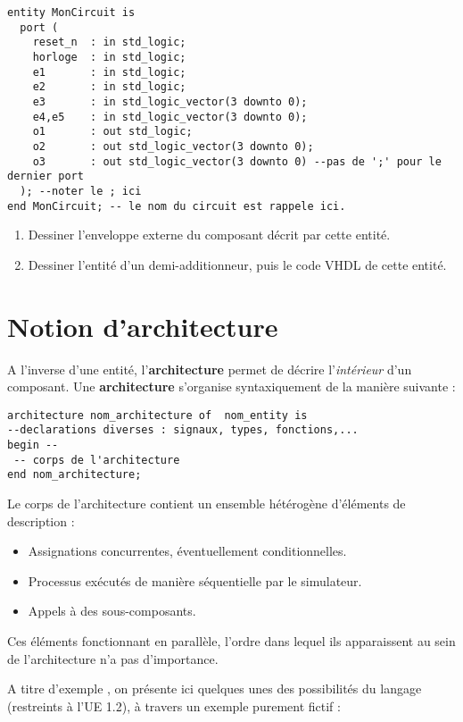 \documentclass[a4paper,11pt]{article}
\begin{document}
\begin{lstlisting}
entity MonCircuit is
  port (
    reset_n  : in std_logic;
    horloge  : in std_logic;
    e1       : in std_logic;
    e2       : in std_logic;
    e3       : in std_logic_vector(3 downto 0);
    e4,e5    : in std_logic_vector(3 downto 0);
    o1       : out std_logic;
    o2       : out std_logic_vector(3 downto 0);
    o3       : out std_logic_vector(3 downto 0) --pas de ';' pour le dernier port
  ); --noter le ; ici
end MonCircuit; -- le nom du circuit est rappele ici.
\end{lstlisting}

\begin{enumerate}
  \item Dessiner l'enveloppe externe du composant décrit par cette entité.
  \item Dessiner l'entité d'un demi-additionneur, puis le code VHDL de cette entité.
\end{enumerate}

\section{Notion d'architecture}
A l'inverse d'une entité, l'\textbf{architecture} permet de décrire l'{\it intérieur} d'un composant.
Une \textbf{architecture} s'organise syntaxiquement de la manière suivante :

\begin{lstlisting}
architecture nom_architecture of  nom_entity is
--declarations diverses : signaux, types, fonctions,...
begin --
 -- corps de l'architecture
end nom_architecture;
\end{lstlisting}

Le corps de l'architecture contient un ensemble hétérogène d'éléments de description :

\begin{itemize}
  \item Assignations concurrentes, éventuellement conditionnelles.
  \item Processus exécutés de manière séquentielle par le simulateur.
  \item Appels à des sous-composants.
\end{itemize}

Ces éléments fonctionnant en parallèle, l'ordre dans lequel ils apparaissent au sein de l'architecture n'a pas d'importance.

A titre d'exemple , on présente ici quelques unes des possibilités du langage (restreints à l'UE 1.2), à travers
un exemple purement fictif :
\end{document}
